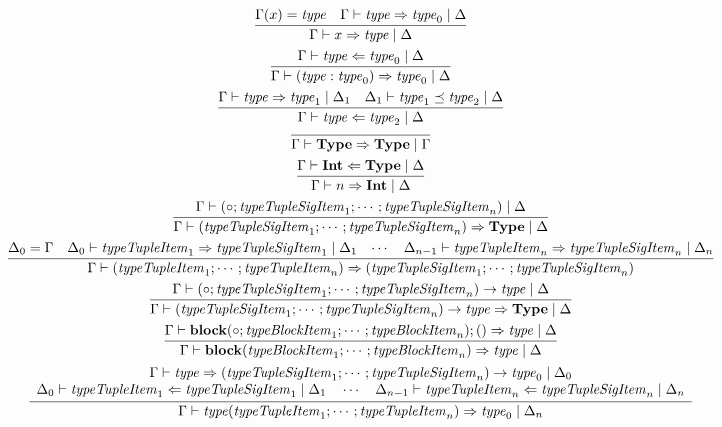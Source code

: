 \begin{gather*}
  \infer{\Gamma \vdash x \Rightarrow \mathit{type} \mid \Delta}{
    \Gamma(x) = \mathit{type}
    &
    \Gamma \vdash \mathit{type} \Rightarrow \mathit{type}_0 \mid \Delta
  }
  \\
  \infer{\Gamma \vdash (\mathit{type}: \mathit{type}_0) \Rightarrow \mathit{type}_0 \mid \Delta}{
    \Gamma \vdash \mathit{type} \Leftarrow \mathit{type}_0 \mid \Delta
  }
  \\
  \infer{\Gamma \vdash \mathit{type} \Leftarrow \mathit{type}_2 \mid \Delta}{
    \Gamma \vdash \mathit{type} \Rightarrow \mathit{type}_1 \mid \Delta_1
    &
    \Delta_1 \vdash \mathit{type}_1 \preceq \mathit{type}_2 \mid \Delta
  }
  \\
  \infer{\Gamma \vdash \mathbf{Type} \Rightarrow \mathbf{Type} \mid \Gamma}{}
  \\
  \infer{\Gamma \vdash n \Rightarrow \mathbf{Int} \mid \Delta}{
    \Gamma \vdash \mathbf{Int} \Leftarrow \mathbf{Type} \mid \Delta
  }
  \\
  \infer{\Gamma \vdash (\mathit{typeTupleSigItem}_1; \cdots; \mathit{typeTupleSigItem}_n) \Rightarrow \mathbf{Type} \mid \Delta}{
    \Gamma \vdash (\circ; \mathit{typeTupleSigItem}_1; \cdots; \mathit{typeTupleSigItem}_n) \mid \Delta
  }
  \\
  \infer{\Gamma \vdash (\mathit{typeTupleItem}_1; \cdots; \mathit{typeTupleItem}_n) \Rightarrow (\mathit{typeTupleSigItem}_1; \cdots; \mathit{typeTupleSigItem}_n)}{
    \Delta_0 = \Gamma
    &
    \Delta_0 \vdash \mathit{typeTupleItem}_1 \Rightarrow \mathit{typeTupleSigItem}_1 \mid \Delta_1
    &
    \cdots
    &
    \Delta_{n - 1} \vdash \mathit{typeTupleItem}_n \Rightarrow \mathit{typeTupleSigItem}_n \mid \Delta_n
  }
  \\
  \infer{\Gamma \vdash (\mathit{typeTupleSigItem}_1; \cdots; \mathit{typeTupleSigItem}_n) \rightarrow \mathit{type} \Rightarrow \mathbf{Type} \mid \Delta}{
    \Gamma \vdash (\circ; \mathit{typeTupleSigItem}_1; \cdots; \mathit{typeTupleSigItem}_n) \rightarrow \mathit{type} \mid \Delta
  }
  \\
  \infer{\Gamma \vdash \mathbf{block}(\mathit{typeBlockItem}_1; \cdots; \mathit{typeBlockItem}_n) \Rightarrow \mathit{type} \mid \Delta}{
    \Gamma \vdash \mathbf{block}(\circ; \mathit{typeBlockItem}_1; \cdots; \mathit{typeBlockItem}_n); () \Rightarrow \mathit{type} \mid \Delta
  }
  \\
  \infer{\Gamma \vdash \mathit{type}(\mathit{typeTupleItem}_1; \cdots; \mathit{typeTupleItem}_n) \Rightarrow \mathit{type}_0 \mid \Delta_n}{
    \begin{array}{c}
      \Gamma \vdash \mathit{type} \Rightarrow (\mathit{typeTupleSigItem}_1; \cdots; \mathit{typeTupleSigItem}_n) \rightarrow \mathit{type}_0 \mid \Delta_0
      \\
      \Delta_0 \vdash \mathit{typeTupleItem}_1 \Leftarrow \mathit{typeTupleSigItem}_1 \mid \Delta_1
      \hspace{1em}
      \cdots
      \hspace{1em}
      \Delta_{n - 1} \vdash \mathit{typeTupleItem}_n \Leftarrow \mathit{typeTupleSigItem}_n \mid \Delta_n
    \end{array}
  }
\end{gather*}

